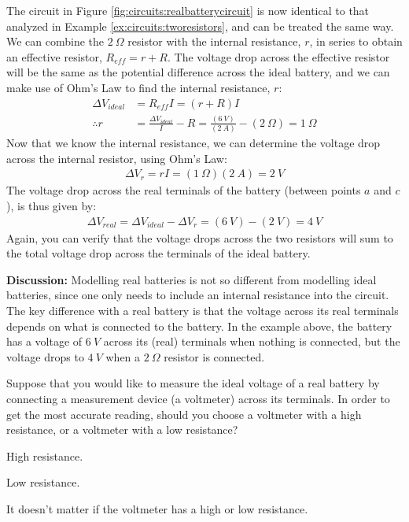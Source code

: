 \begin{example}
The circuit in Figure \ref{fig:circuits:realbatterycircuit} is now identical to that analyzed in Example \ref{ex:circuits:tworesistors}, and can be treated the same way. We can combine the $\SI{2}{\Omega}$ resistor with the internal resistance, $r$, in series to obtain an effective resistor, $R_{eff}=r+R$. The voltage drop across the effective resistor will be the same as the potential difference across the ideal battery, and we can make use of Ohm's Law to find the internal resistance, $r$:
\begin{align*}
\Delta V_{ideal}&= R_{eff}I=(r+R)I\\
\therefore r &= \frac{\Delta V_{ideal}}{I}-R=\frac{(\SI{6}{V})}{(\SI{2}{A})}-(\SI{2}{\Omega})=\SI{1}{\Omega}
\end{align*}
Now that we know the internal resistance, we can determine the voltage drop across the internal resistor, using Ohm's Law:
\begin{align*}
\Delta V_r = rI=(\SI{1}{\Omega})(\SI{2}{A})=\SI{2}{V}
\end{align*}
The voltage drop across the real terminals of the battery (between points $a$ and $c$), is thus given by:
\begin{align*}
\Delta V_{real}=\Delta V_{ideal}-\Delta V_r=(\SI{6}{V})-(\SI{2}{V})=\SI{4}{V}
\end{align*}
Again, you can verify that the voltage drops across the two resistors will sum to the total voltage drop across the terminals of the ideal battery. 


\textbf{Discussion: } Modelling real batteries is not so different from modelling ideal batteries, since one only needs to include an internal resistance into the circuit. The key difference with a real battery is that the voltage across its real terminals depends on what is connected to the battery. In the example above, the battery has a voltage of $\SI{6}{V}$ across its (real) terminals when nothing is connected, but the voltage drops to $\SI{4}{V}$ when a $\SI{2}{\Omega}$ resistor is connected.
\end{example}

\begin{checkpoint}{}
	\begin{MCquestion}{Suppose that you would like to measure the ideal voltage of a real battery by connecting a measurement device (a voltmeter) across its terminals. In order to get the most accurate reading, should you choose a voltmeter with a high resistance, or a voltmeter with a low resistance?}
		\item High resistance. \correct
		\item Low resistance.
		\item It doesn't matter if the voltmeter has a high or low resistance.
	\end{MCquestion}
\end{checkpoint}

